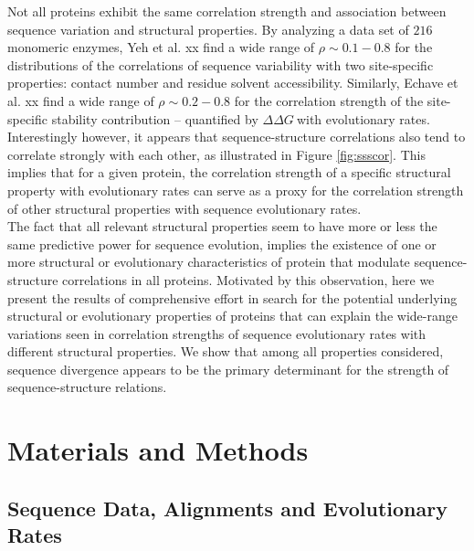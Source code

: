 \documentclass[11pt]{article}
\newcommand{\ddg}{$\Delta\Delta G~$}
\begin{document}
    Not all proteins exhibit the same correlation strength and association between sequence variation and structural properties. By analyzing a data set of $216$ monomeric enzymes, Yeh et al. xx find a wide range of $\rho\sim0.1-0.8$ for the distributions of the correlations of sequence variability with two site-specific properties: contact number and residue solvent accessibility. Similarly, Echave et al. xx find a wide range of $\rho\sim0.2-0.8$ for the correlation strength of the site-specific stability contribution -- quantified by \ddg with evolutionary rates. Interestingly however, it appears that sequence-structure correlations also tend to correlate strongly with each other, as illustrated in Figure \ref{fig:ssscor}. This implies that for a given protein, the correlation strength of a specific structural property with evolutionary rates can serve as a proxy for the correlation strength of other structural properties with sequence evolutionary rates.
    \\

    The fact that all relevant structural properties seem to have more or less the same predictive power for sequence evolution, implies the existence of one or more structural or evolutionary characteristics of protein that modulate sequence-structure correlations in all proteins. Motivated by this observation, here we present the results of comprehensive effort in search for the potential underlying structural or evolutionary properties of proteins that can explain the wide-range variations seen in correlation strengths of sequence evolutionary rates with different structural properties.  We show that among all properties considered, sequence divergence appears to be the primary determinant for the strength of sequence-structure relations.
    \\


\section{Materials and Methods}
\label{sec:mam}

    \subsection*{Sequence Data, Alignments and Evolutionary Rates}
\end{document}

